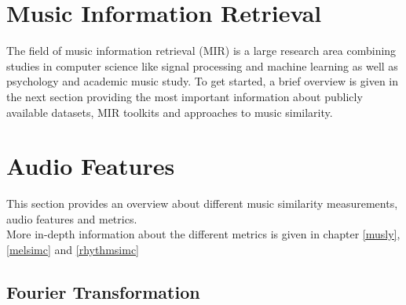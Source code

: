 \section{Music Information Retrieval}
The field of music information retrieval (MIR) is a large research area combining studies in computer science like signal processing and machine learning as well as psychology and academic music study. To get started, a brief overview is given in the next section providing the most important information about publicly available datasets, MIR toolkits and approaches to music similarity.

\section{Audio Features}

This section provides an overview about different music similarity measurements, audio features and metrics.\\
More in-depth information about the different metrics is given in chapter \ref{musly}, \ref{melsimc} and \ref{rhythmsimc}

\subsection{Fourier Transformation}\label{featsec}

